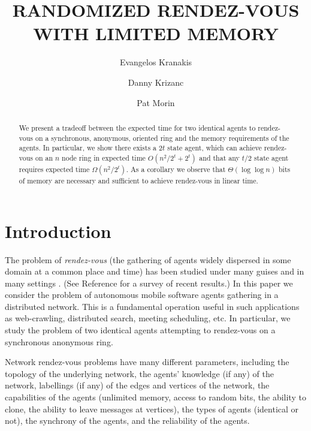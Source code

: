 \documentclass{patmorin}
\title{\MakeUppercase{Randomized Rendez-Vous with Limited Memory}}
\author{Evangelos Kranakis \and
	Danny Krizanc \and
	Pat Morin}
\begin{document}
\maketitle
\begin{abstract}
We present a tradeoff between the expected time for two identical
agents to rendez-vous on a synchronous, anonymous, oriented ring and
the memory requirements of the agents. In particular, we show  there
exists a $2t$ state agent, which can achieve rendez-vous on an $n$
node ring in expected time $O( n^2/2^{t} + 2^{t} )$ and that any $t/2$
state agent requires expected time $\Omega( n^2/2^t )$. As a corollary
we observe that $\Theta(\log \log n)$ bits of memory are necessary and
sufficient to achieve rendez-vous in linear time.
\end{abstract}

\section{Introduction}

The problem of {\em rendez-vous} (the gathering of agents
widely dispersed in some domain at a common place and
time) has been studied under many guises and in many settings
\cite{alpernGal03,Marco,dessmark,dobrev,fkkss,fkklss,gakra,kowalski1,
kowalski2,kkss,markou,RoyDudek,sawchuk04,Yamashita,yu}.  (See Reference
\cite{kkr} for a survey of recent results.) In this paper we consider the
problem of autonomous mobile software agents gathering in a distributed
network. This is a fundamental operation useful in such applications as
web-crawling, distributed search, meeting scheduling, etc. In particular,
we study the problem of two identical agents attempting to rendez-vous
on a synchronous anonymous ring.

Network rendez-vous problems have many different parameters, including
the topology of the underlying network, the agents' knowledge (if any) of
the network, labellings (if any) of the edges and vertices of the network,
the capabilities of the agents (unlimited memory, access to random bits,
the ability to clone, the ability to leave messages at vertices), the
types of agents (identical or not), the synchrony of the agents, and
the reliability of the agents. 
\end{document}
